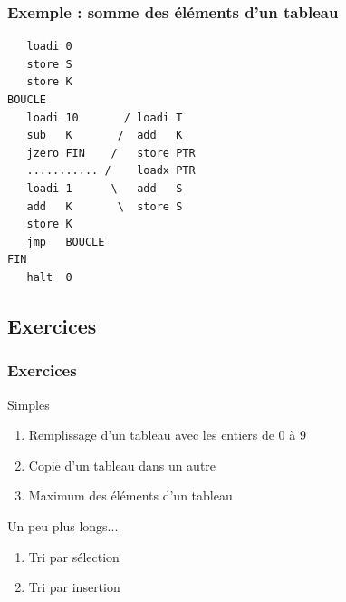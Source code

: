 \begin{frame}[containsverbatim]
  \frametitle{Exemple : somme des éléments d'un tableau}





\begin{lstlisting}
   loadi 0
   store S
   store K
BOUCLE
   loadi 10       / loadi T
   sub   K       /  add   K
   jzero FIN    /   store PTR
   ........... /    loadx PTR
   loadi 1      \   add   S
   add   K       \  store S
   store K
   jmp   BOUCLE
FIN
   halt  0
\end{lstlisting}

\end{frame}

\subsection{Exercices}

\begin{frame}
  \frametitle{Exercices}

\alert{Simples}
\begin{enumerate}
\item Remplissage d'un tableau avec les entiers de 0 à 9
\item Copie d'un tableau dans un autre
\item Maximum des éléments d'un tableau
\end{enumerate}
\alert{Un peu plus longs...}
\begin{enumerate}
\item Tri par sélection
\item Tri par insertion
\end{enumerate}

\end{frame}



